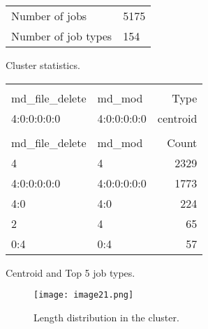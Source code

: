 \documentclass{jhps}
\begin{document}
\noindent\begin{minipage}{\textwidth}
\captionsetup{type=table}

\begingroup
  \begin{subtable}{\textwidth}
  \centering
  \begin{tabular}{ll}
    Number of jobs & 5175 \\
    Number of job types & 154 \\
  \end{tabular}
  \caption{Cluster statistics.}
  \label{fig:pm_quant:stats}
  \end{subtable}
\endgroup

\medskip

\begingroup
  \begin{subtable}{\textwidth}
  \centering
  \begin{tiny}
    \begin{tabular}{@{ }l@{ }@{ }l@{ }|@{ }r@{ }}
      \rowcolor{tabhcolor}
      \multicolumn{2}{@{ }l|@{ }}{Hexadecimal coding} &              \\
      \rowcolor{tabhcolor}
      md\_file\_delete     &  md\_mod     & Type     \\
      \hline
      4:0:0:0:0:0          &  4:0:0:0:0:0 & centroid \\
      \multicolumn{3}{l}{} \\
			\rowcolor{tabhcolor}
      md\_file\_delete     &  md\_mod     & Count    \\
      \hline
      4                    &  4           & 2329     \\
      4:0:0:0:0:0          &  4:0:0:0:0:0 & 1773     \\
      4:0                  &  4:0         & 224      \\
      2                    &  4           & 65       \\
      0:4                  &  0:4         & 57       \\
    \end{tabular}
  \end{tiny}
  \caption{Centroid and Top 5 job types.}
  \label{fig:pm_quant:top_jobs}
  \end{subtable}
\endgroup

\medskip

\begingroup
  \begin{subfigure}{\textwidth}
  \centering
  \texttt{[image: image21.png]}
  \caption{Length distribution in the cluster.}
  \label{fig:pm_quant:length}
  \end{subfigure}
\endgroup

\label{fig:pm_quant}
\end{minipage}
\end{document}
